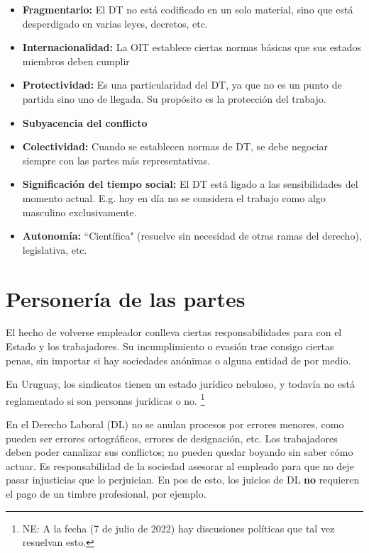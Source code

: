 \documentclass[../main.tex]{subfiles}
\begin{document}
\begin{itemize}

\item \textbf{Fragmentario:} El DT no está codificado en un solo material, sino que está desperdigado en varias leyes, decretos, etc.

\item \textbf{Internacionalidad:} La OIT establece ciertas normas básicas que sus estados miembros deben cumplir

\item \textbf{Protectividad:} Es una particularidad del DT, ya que no es un punto de partida sino uno de llegada. Su propósito es la protección del trabajo.

\item \textbf{Subyacencia del conflicto}

\item \textbf{Colectividad:} Cuando se establecen normas de DT, se debe negociar siempre con las partes más representativas.

\item \textbf{Significación del tiempo social:} El DT está ligado a las sensibilidades del momento actual. E.g. hoy en día no se considera el trabajo como algo masculino exclusivamente.

\item \textbf{Autonomía:} ``Científica" (resuelve sin necesidad de otras ramas del derecho), legislativa, etc.

\end{itemize}

\section{Personería de las partes}

El hecho de volverse empleador conlleva ciertas responsabilidades para con el Estado y los trabajadores.
Su incumplimiento o evasión trae consigo ciertas penas, sin importar si hay sociedades anónimas o alguna entidad de por medio.

En Uruguay, los sindicatos tienen un estado jurídico nebuloso, y todavía no está reglamentado si son personas jurídicas o no.
\footnote{NE: A la fecha (7 de julio de 2022) hay discusiones políticas que tal vez resuelvan esto.}

En el Derecho Laboral (DL) no se anulan procesos por errores menores, como pueden ser errores ortográficos, errores de designación, etc.
Los trabajadores deben poder canalizar sus conflictos; no pueden quedar boyando sin saber cómo actuar.
Es responsabilidad de la sociedad asesorar al empleado para que no deje pasar injusticias que lo perjuician.
En pos de esto, los juicios de DL \textbf{no} requieren el pago de un timbre profesional, por ejemplo.
\end{document}
